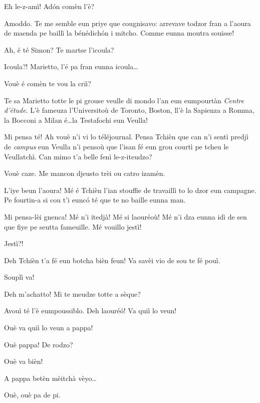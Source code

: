 \begin{drama}
\Mariettospeaks Eh le-z-amì! Ad\'on comèn l’è?

\Cienspeaks Amoddo. Te me semble eun priye que cougnisavo: arrevave todzor fran a l’aoura de maenda pe baillì la bénédich\'on i mitcho. Comme eunna moutra souisse!

\Mariettospeaks Ah, é té Simon? Te martse l’icoula?

\Simonspeaks Icoula?! Marietto, l’é pa fran eunna icoula\ldots

\Mariettospeaks Vouè é comèn te vou la criì?

\Simonspeaks Te sa Marietto totte le pi grouse veulle di mondo l’an eun eumpourtàn \textit{Centre d'étude}. L’è fameuza l’Universitoù de Toronto, Boston, ll'è la Sapienza a Romma, la Bocconi a Milan é\ldots la Testafochi eun Veulla!

\Mariettospeaks Mi pensa té! Ah vouè n’i vi lo téléjournal. Pensa Tchièn que can n’i sentì predjì de \textit{campus} eun Veulla n’i pensoù que l’isan fé eun grou courtì pe tcheu le Veullatchì. Can mimo t’a belle fenì le-z-iteudzo?

\Simonspeaks Vouè caze. Me mancon djeusto trèi ou catro izamèn.

\Mariettospeaks L'iye beun l’aoura! Mé é Tchièn l'ian stouffie de travaillì to lo dzor eun campagne. Pe fourtin-a si cou t’i eunc\'o té que te no baille eunna man.

\Simonspeaks Mi pensa-lèi gnenca! Mé n'i itedjà! Mé si laouréoù! Mé n’i dza eunna idì de sen que fiye pe seutta fameuille. Mé vouillo jestì!

\Cienspeaks Jestì?!

\Mariettospeaks Deh Tchièn t’a fé eun botcha bièn feun! Va savèi vio de sou te fé pouì.

\Cienspeaks Souplì va!

\Mariettospeaks Deh m’achatto! Mi te meudze totte a sèque?

\Cienspeaks Avouì té l’è eumpoussiblo.  Deh laouré\'o! Va quiì lo veun!

\Mariettospeaks Ouè va quiì lo veun a pappa!

\Simonspeaks {} Ouè pappa! De rodzo?

\Mariettospeaks Ouè va bièn!


\Simonspeaks A pappa betèn mèitchà vèyo\ldots

\Cienspeaks Ouè, ouè pa de pi.


\end{drama}
